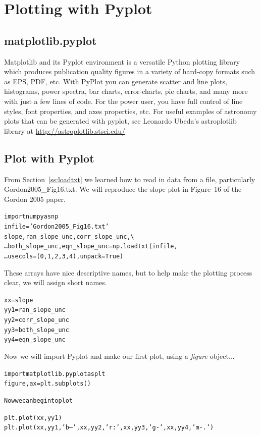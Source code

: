 \chapter{Plotting with Pyplot}
\label{ch:pyplot}

\section{matplotlib.pyplot}
Matplotlib and its Pyplot environment is a versatile Python plotting
library which produces publication quality figures in a variety of
hard-copy formats such as EPS, PDF, etc.  With PyPlot you can
generate scatter and line plots, histograms, power spectra, bar
charts, error-charts, pie charts, and many more with just a few lines
of code. For the power user, you have full control of line styles,
font properties, and axes properties, etc. For useful examples of 
astronomy plots that can be generated with pyplot, see Leonardo 
Ubeda's astroplotlib library at \href{http://astroplotlib.stsci.edu/}
{http://astroplotlib.stsci.edu/}



\section{Plot with Pyplot}
From Section~\ref{ss:loadtxt} we learned how to read in data from a
file, particularly Gordon2005\_Fig16.txt.  We will reproduce the slope
plot in Figure~16 of the Gordon 2005 paper.

\begin{alltt}
\pytab import numpy as np 
\pytab infile = 'Gordon2005_Fig16.txt' 
\pytab slope, ran_slope_unc, corr_slope_unc, \textbackslash 
\ldots     both_slope_unc, eqn_slope_unc = np.loadtxt(infile, 
\ldots     usecols=(0, 1, 2, 3, 4), unpack=True) 
\end{alltt}

These arrays have nice descriptive names, but to help make the
plotting process clear, we will assign short names.

\begin{alltt}
\pytab xx = slope  
\pytab yy1 = ran_slope_unc  
\pytab yy2 = corr_slope_unc  
\pytab yy3 = both_slope_unc
\pytab yy4 = eqn_slope_unc 
\end{alltt}

Now we will import Pyplot and make our first plot, using a \textit{figure} 
object...

\begin{alltt}
\pytab import matplotlib.pyplot as plt  
\pytab figure, ax = plt.subplots()

Now we can begin to plot 

\pytab plt.plot(xx,yy1)  
\pytab plt.plot(xx,yy1,'b--',xx,yy2,'r:',xx,yy3,'g-', xx,yy4,'m-.')  
\end{alltt}

